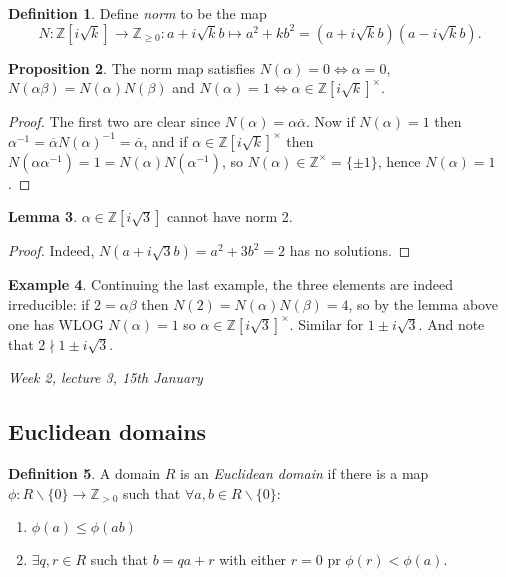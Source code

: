 \documentclass{article}
\newcommand{\Z}{\mathbb{Z}}
\theoremstyle{definition}
\newtheorem{defn}{Definition}[subsection]
\newtheorem{prop}[defn]{Proposition}
\newtheorem{lemma}[defn]{Lemma}
\newtheorem{example}[defn]{Example}
\begin{document}
\begin{defn}
Define \textit{norm} to be the map
\[
N:\Z\left[i\sqrt k\right]\rightarrow\Z_{\geq 0}:a+i\sqrt kb\mapsto a^2+kb^2=\left(a+i\sqrt kb\right)\left(a-i\sqrt kb\right).
\]
\end{defn}

\begin{prop}
The norm map satisfies $N(\alpha)=0\iff\alpha=0$, $N(\alpha\beta)=N(\alpha)N(\beta)$ and $N(\alpha)=1\iff\alpha\in\Z\left[i\sqrt k\right]^\times$.
\end{prop}
\begin{proof}
The first two are clear since $N(\alpha)=\alpha\overline\alpha$. Now if $N(\alpha)=1$ then $\alpha^{-1}=\overline\alpha N(\alpha)^{-1}=\overline\alpha$, and if $\alpha\in\Z\left[i\sqrt k\right]^\times$ then $N(\alpha\alpha^{-1})=1=N(\alpha)N(\alpha^{-1})$, so $N(\alpha)\in\Z^\times=\{\pm 1\}$, hence $N(\alpha)=1$.
\end{proof}

\begin{lemma}
$\alpha\in\Z\left[i\sqrt 3\right]$ cannot have norm 2.
\end{lemma}
\begin{proof}
Indeed, $N\left(a+i\sqrt 3b\right)=a^2+3b^2=2$ has no solutions.
\end{proof}

\begin{example}
Continuing the last example, the three elements are indeed irreducible: if $2=\alpha\beta$ then $N(2)=N(\alpha)N(\beta)=4$, so by the lemma above one has WLOG $N(\alpha)=1$ so $\alpha\in\Z\left[i\sqrt 3\right]^\times$. Similar for $1\pm i\sqrt 3$. And note that $2\nmid 1\pm i\sqrt 3$.
\end{example}

\begin{flushright}
\textit{Week 2, lecture 3, 15th January}
\end{flushright}

\subsection{Euclidean domains}
\begin{defn}
A domain $R$ is an \textit{Euclidean domain} if there is a map $\phi:R\backslash\{0\}\rightarrow\Z_{>0}$ such that $\forall a,b\in R\backslash\{0\}$:
\begin{enumerate}
\item $\phi(a)\leq\phi(ab)$
\item $\exists q,r\in R$ such that $b=qa+r$ with either $r=0$ pr $\phi(r)<\phi(a)$.
\end{enumerate}
\end{defn}
\end{document}
